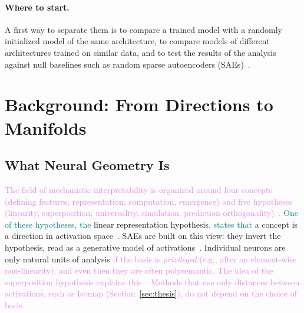 \documentclass[11pt,a4paper]{article}
\newcommand{\fromold}[1]{\textcolor{violet}{#1}}
\newcommand{\fromclaude}[1]{\textcolor{orange!85!black}{#1}}
\newcommand{\fromprose}[1]{\textcolor{teal}{#1}}
\newcommand{\fromold}[1]{#1}
\newcommand{\fromclaude}[1]{#1}
\newcommand{\fromprose}[1]{#1}
\begin{document}
\paragraph{Where to start.}
A first way to separate them is to compare a trained model with a randomly initialized model of the same architecture, to compare models of different architectures trained on similar data, and to test the results of the analysis against null baselines such as random sparse autoencoders (SAEs)~\cite{korznikov2026sanity}.

\section{Background: From Directions to Manifolds}

\subsection{What Neural Geometry Is}
\fromold{The field of mechanistic interpretability is organized around four concepts (defining features, representation, computation, emergence) and five hypotheses (linearity, superposition, universality, simulation, prediction orthogonality)~\cite{bereska2024review}.}
\fromprose{One of these hypotheses, the} linear representation hypothesis\fromprose{, states that} a concept is a direction in activation space~\cite{park2024linear}. SAEs are built on this view: they invert the hypothesis, read as a generative model of activations~\cite{bhalla2026saemanifolds}.
\fromclaude{Individual neurons are only natural units of analysis} \fromold{if the basis is \emph{privileged} (e.g., after an element-wise non-linearity), and even then they are often polysemantic. The idea of the superposition hypothesis explains this~\cite{elhage2022toy,bereska2024review}. Methods that use only distances between activations, such as Isomap (Section~\ref{sec:thesis}), do not depend on the choice of basis.}
\end{document}
